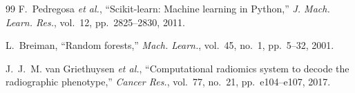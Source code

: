\documentclass[journal]{IEEEtran}
\begin{document}
\begin{thebibliography}{99}
 F.~Pedregosa \emph{et al.}, ``Scikit-learn: Machine
learning in Python,'' \emph{J. Mach. Learn. Res.}, vol.~12, pp.~2825--2830, 2011.

 L.~Breiman, ``Random forests,'' \emph{Mach. Learn.},
vol.~45, no.~1, pp.~5--32, 2001.

 J.~J.~M. van Griethuysen \emph{et al.},
``Computational radiomics system to decode the radiographic phenotype,'' \emph{Cancer
Res.}, vol.~77, no.~21, pp.~e104--e107, 2017.
\end{thebibliography}
\end{document}
